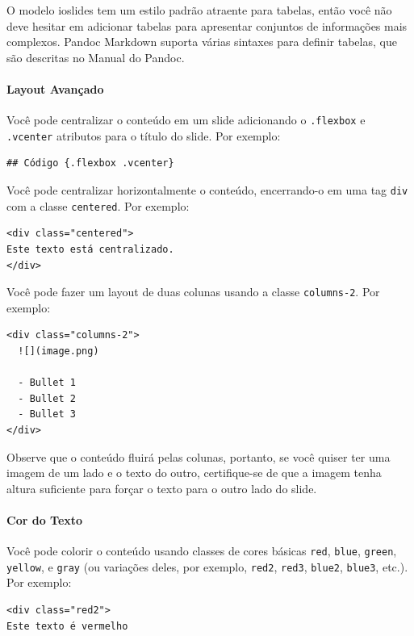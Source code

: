 \documentclass[
]{book}
\begin{document}
O modelo ioslides tem um estilo padrão atraente para tabelas, então você não deve hesitar em adicionar tabelas para apresentar conjuntos de informações mais complexos. Pandoc Markdown suporta várias sintaxes para definir tabelas, que são descritas no Manual do Pandoc.

\hypertarget{layout-avanuxe7ado}{%
\paragraph{Layout Avançado}\label{layout-avanuxe7ado}}

Você pode centralizar o conteúdo em um slide adicionando o \texttt{.flexbox} e \texttt{.vcenter} atributos para o título do slide.
Por exemplo:

\begin{verbatim}
## Código {.flexbox .vcenter}
\end{verbatim}

Você pode centralizar horizontalmente o conteúdo, encerrando-o em uma tag \texttt{div} com a classe \texttt{centered}. Por exemplo:

\begin{verbatim}
<div class="centered">
Este texto está centralizado.
</div>
\end{verbatim}

Você pode fazer um layout de duas colunas usando a classe \texttt{columns-2}. Por exemplo:

\begin{verbatim}
<div class="columns-2">
  ![](image.png)

  - Bullet 1
  - Bullet 2
  - Bullet 3
</div>
\end{verbatim}

Observe que o conteúdo fluirá pelas colunas, portanto, se você quiser ter uma imagem de um lado e o texto do outro, certifique-se de que a imagem tenha altura suficiente para forçar o texto para o outro lado do slide.

\hypertarget{cor-do-texto}{%
\paragraph{Cor do Texto}\label{cor-do-texto}}

Você pode colorir o conteúdo usando classes de cores básicas \texttt{red}, \texttt{blue}, \texttt{green}, \texttt{yellow}, e \texttt{gray} (ou variações deles, por exemplo, \texttt{red2}, \texttt{red3}, \texttt{blue2}, \texttt{blue3}, etc.). Por exemplo:

\begin{verbatim}
<div class="red2">
Este texto é vermelho
\end{verbatim}
\end{document}
